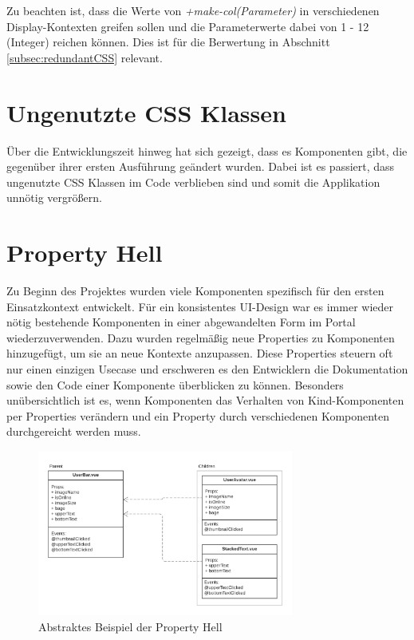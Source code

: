 Zu beachten ist, dass die Werte von \textit{+make-col(Parameter)} in verschiedenen Display-Kontexten greifen sollen und die Parameterwerte dabei von 1 - 12 (Integer) reichen können. Dies ist für die Berwertung in Abschnitt \ref{subsec:redundantCSS} relevant.
 
\section{Ungenutzte CSS Klassen}
\label{sec:unusedCSS}
Über die Entwicklungszeit hinweg hat sich gezeigt, dass es Komponenten gibt, die gegenüber ihrer ersten Ausführung geändert wurden. Dabei ist es passiert, dass ungenutzte CSS Klassen im Code verblieben sind und somit die Applikation unnötig vergrößern.

\section{Property Hell}
\label{sec:propertyHell}
Zu Beginn des Projektes wurden viele Komponenten spezifisch für den ersten Einsatzkontext entwickelt. Für ein konsistentes UI-Design war es immer wieder nötig bestehende Komponenten in einer abgewandelten Form im Portal wiederzuverwenden. Dazu wurden regelmäßig neue Properties zu Komponenten hinzugefügt, um sie an neue Kontexte anzupassen. Diese Properties steuern oft nur einen einzigen Usecase und erschweren es den Entwicklern die Dokumentation sowie den Code einer Komponente überblicken zu können. Besonders unübersichtlich ist es, wenn Komponenten das Verhalten von Kind-Komponenten per Properties verändern und ein Property durch verschiedenen Komponenten durchgereicht werden muss.

\begin{figure}[!ht]
	\centering
		\includegraphics[width=0.75\textwidth]{images/003-000-001-property-hell.png}
	\caption{Abstraktes Beispiel der Property Hell}
	\label{fig:propertyHell}
\end{figure}

